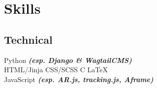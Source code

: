 \documentclass[a4paper]{deedy-resume} %
\begin{document}
\begin{minipage}[t]{0.33\textwidth}



\sectionspace
\section{Skills}

\subsection{Technical}

Python {\footnotesize \textit{\textbf{(esp. Django \& WagtailCMS)}}} \\
HTML/Jinja \textbullet{} CSS/SCSS \textbullet{} C \textbullet{} \LaTeX\  \textbullet{}\\
JavaScript {\footnotesize \textit{\textbf{(esp. AR.js, tracking.js, Aframe)}}} \\


\end{minipage}
\end{document}
